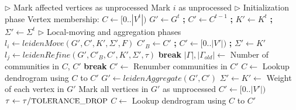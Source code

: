 \begin{algorithm}[hbtp]
\begin{algorithmic}[1]
 \label{alg:leiden--begin}
  \State $\rhd$ Mark affected vertices as unprocessed
   \label{alg:leiden--mark-begin}
     Mark $i$ as unprocessed
    \EndIf
  \EndFor \label{alg:leiden--mark-end}
  \State $\rhd$ Initialization phase
  \State Vertex membership: $C \gets [0 .. |V^t|)$ \label{alg:leiden--init-begin}
  \State $G' \gets G^t$ \textbf{;} $C' \gets C^{t-1}$ \textbf{;} $K' \gets K^t$ \textbf{;} $\Sigma' \gets \Sigma^t$ \label{alg:leiden--init-end}
  \State $\rhd$ Local-moving and aggregation phases
  \ForAll{$l_p \in [0 .. \text{\small{MAX\_PASSES}})$} \label{alg:leiden--passes-begin}
    \State $l_i \gets leidenMove(G', C', K', \Sigma', F)$  \label{alg:leiden--local-move}
    \State $C'_B \gets C'$ \textbf{;} $C' \gets [0 .. |V'|)$ \textbf{;} $\Sigma' \gets K'$ \label{alg:leiden--reset-again}
    \State $l_j \gets leidenRefine(G', C'_B, C', K', \Sigma', \tau)$  \label{alg:leiden--refine}
     \textbf{break}  \label{alg:leiden--globally-converged}
    \EndIf
    \State $|\Gamma|, |\Gamma_{old}| \gets$ Number of communities in $C$, $C'$
     \textbf{break}  \label{alg:leiden--aggregation-tolerance}
    \EndIf
    \State $C' \gets$ Renumber communities in $C'$ \label{alg:leiden--renumber}
    \State $C \gets$ Lookup dendrogram using $C$ to $C'$ \label{alg:leiden--lookup}
    \State $G' \gets leidenAggregate(G', C')$  \label{alg:leiden--aggregate}
    \State $\Sigma' \gets K' \gets$ Weight of each vertex in $G'$ \label{alg:leiden--reset-weights}
    \State Mark all vertices in $G'$ as unprocessed \label{alg:leiden--reset-affected}
    \State $C' \gets [0 .. |V'|)$  \label{alg:leiden--useparent}
    \State $\tau \gets \tau / \text{\small{TOLERANCE\_DROP}}$  \label{alg:leiden--threshold-scaling}
  \EndFor \label{alg:leiden--passes-end}
  \State $C \gets$ Lookup dendrogram using $C$ to $C'$ \label{alg:leiden--lookup-last}
   \label{alg:leiden--return}
\EndFunction \label{alg:leiden--end}
\end{algorithmic}
\end{algorithm}




